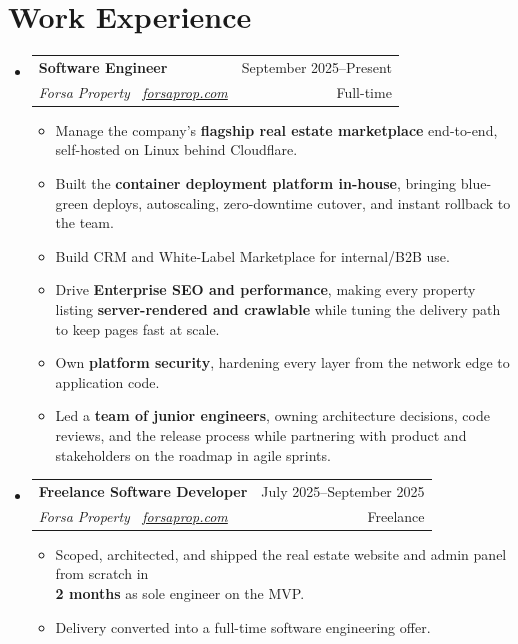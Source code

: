 \documentclass[a4paper,12pt]{article}
\makeatletter
\newcommand{\resumeSubheading}[4]{
\vspace{0.5mm}\item
    \begin{tabular*}{0.98\textwidth}[t]{l@{\extracolsep{\fill}}r}
        \textbf{#1} & {\footnotesize{#4}} \\
        \textit{\footnotesize{#3}} &  \footnotesize{#2}\\
    \end{tabular*}
    \vspace{-2.4mm}
}
\newcommand{\resumeSubHeadingListStart}{\begin{itemize}[leftmargin=*,labelsep=0mm]}
\newcommand{\resumeItemListStart}{\begin{justify}\begin{itemize}[leftmargin=3ex, rightmargin=2ex, noitemsep,labelsep=1.2mm,itemsep=0mm]}
\newcommand{\resumeSubHeadingListEnd}{\end{itemize}\vspace{1mm}}
\newcommand{\resumeItemListEnd}{\end{itemize}\end{justify}\vspace{-2mm}}
\makeatother
\begin{document}
\section{\textbf{Work Experience}}
  \resumeSubHeadingListStart
    \resumeSubheading
      {Software Engineer}{Full-time}
      {Forsa Property \, \href{https://forsaprop.com}{\normalfont forsaprop.com}}{September 2025--Present}
      \vspace{-1.5mm}
      \resumeItemListStart
    \item {Manage the company's \textbf{flagship real estate marketplace} end-to-end, self-hosted on Linux behind Cloudflare.}
    \item {Built the \textbf{container deployment platform in-house}, bringing blue-green deploys, autoscaling, zero-downtime cutover, and instant rollback to the team.}
    \item {Build CRM and White-Label Marketplace for internal/B2B use.}
    \item {Drive \textbf{Enterprise SEO and performance}, making every property listing \textbf{server-rendered and crawlable} while tuning the delivery path to keep pages fast at scale.}
    \item {Own \textbf{platform security}, hardening every layer from the network edge to application code.}
    \item {Led a \textbf{team of junior engineers}, owning architecture decisions, code reviews, and the release process while partnering with product and stakeholders on the roadmap in agile sprints.}
    \resumeItemListEnd
    \vspace{1mm}
    \resumeSubheading
      {Freelance Software Developer}{Freelance}
      {Forsa Property \, \href{https://forsaprop.com}{\normalfont forsaprop.com}}{July 2025--September 2025}
      \vspace{-1.5mm}
      \resumeItemListStart
    \item {Scoped, architected, and shipped the real estate website and admin panel from scratch in \\
    \textbf{2 months} as sole engineer on the MVP.}
    \item {Delivery converted into a full-time software engineering offer.}
    \resumeItemListEnd
  \resumeSubHeadingListEnd
\vspace{-3.5mm}

\end{document}
